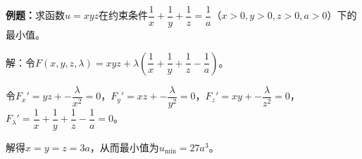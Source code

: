 \textbf{例题：}求函数$u=xyz$在约束条件$\dfrac{1}{x}+\dfrac{1}{y}+\dfrac{1}{z}=\dfrac{1}{a}$（$x>0,y>0,z>0,a>0$）下的最小值。

解：令$F(x,y,z,\lambda)=xyz+\lambda\left(\dfrac{1}{x}+\dfrac{1}{y}+\dfrac{1}{z}-\dfrac{1}{a}\right)$。

令$F_x'=yz+-\dfrac{\lambda}{x^2}=0$，$F_y'=xz+-\dfrac{\lambda}{y^2}=0$，$F_z'=xy+-\dfrac{\lambda}{z^2}=0$，$F_\lambda'=\dfrac{1}{x}+\dfrac{1}{y}+\dfrac{1}{z}-\dfrac{1}{a}=0$。

解得$x=y=z=3a$，从而最小值为$u_{\min}=27a^3$。



%
